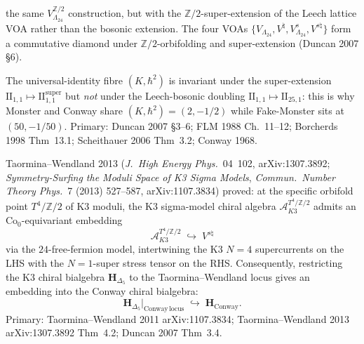\begin{remark}
\begin{enumerate}[label=\textup{(\roman*)}]
the same $V_{\Lambda_{24}}^{\mathbb{Z}/2}$ construction, but with
the $\mathbb{Z}/2$-super-extension of the Leech lattice VOA rather
than the bosonic extension. The four VOAs
$\{V_{\Lambda_{24}}, V^\natural, V_{\Lambda_{24}}^s, V^{s\natural}\}$
form a commutative diamond under $\mathbb{Z}/2$-orbifolding and
super-extension (Duncan 2007 \S6).
\end{enumerate}
The universal-identity fibre $(K, \hbar^2)$ is invariant under
the super-extension $\mathrm{II}_{1,1}\mapsto
\mathrm{II}_{1,1}^{\mathrm{super}}$ but \emph{not} under the
Leech-bosonic doubling $\mathrm{II}_{1,1}\mapsto\mathrm{II}_{25,1}$:
this is why Monster and Conway share
$(K, \hbar^2) = (2, -1/2)$ while Fake-Monster sits at
$(50, -1/50)$.
Primary: Duncan 2007 \S3--6; FLM 1988 Ch.~11--12;
Borcherds 1998 Thm~13.1; Scheithauer 2006 Thm~3.2;
Conway 1968.
\end{remark}

\begin{theorem}
\label{thm:bkm-taormina-wendland-conway-embedding}
Taormina--Wendland 2013 (\emph{J.\ High Energy Phys.}~04~102,
arXiv:1307.3892; \emph{Symmetry-Surfing the Moduli Space of K3 Sigma
Models}, \emph{Commun.\ Number Theory Phys.}~7 (2013) 527--587,
arXiv:1107.3834) proved: at the specific orbifold
point $T^4/\mathbb{Z}/2$ of K3 moduli, the K3 sigma-model chiral
algebra $\mathcal{A}_{K3}^{T^4/\mathbb{Z}/2}$ admits an
$\mathrm{Co}_0$-equivariant embedding
\[
 \mathcal{A}_{K3}^{T^4/\mathbb{Z}/2}
 \;\hookrightarrow\;
 V^{s\natural}
\]
via the $24$-free-fermion model, intertwining the K3
$N{=}4$ supercurrents on the LHS with the $N{=}1$-super
stress tensor on the RHS. Consequently, restricting the
K3 chiral bialgebra $\mathbf{H}_{\Delta_5}$ to the
Taormina--Wendland locus gives an embedding into the Conway
chiral bialgebra:
\[
 \mathbf{H}_{\Delta_5}\bigr|_{\mathrm{Conway\,locus}}
 \;\hookrightarrow\;
 \mathbf{H}_{\mathrm{Conway}}.
\]
Primary: Taormina--Wendland 2011 arXiv:1107.3834;
Taormina--Wendland 2013 arXiv:1307.3892 Thm~4.2; Duncan 2007
Thm~3.4.
\end{theorem}

